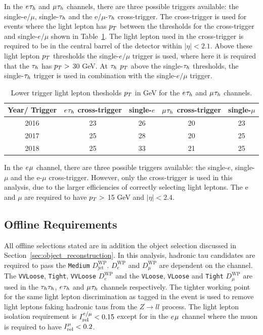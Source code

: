 In the $e_{}\tau_{h}$ and $\mu_{}\tau_{h}$ channels, there are three possible triggers available: the single-e/$\mu$, single-$\tau_{h}$ and the e/$\mu$-$\tau_{h}$ cross-trigger.
The cross-trigger is used for events where the light lepton has $p_{T}$ between the thresholds for the cross-trigger and single-$e/\mu$ shown in Table~\ref{tab:trig_thresholds}.
The light lepton used in the cross-trigger is required to be in the central barrel of the detector within $|\eta| < 2.1$.
Above these light lepton $p_{T}$ thresholds the single-$e/\mu$ trigger is used, where here it is required that the $\tau_{h}$ has $p_{T} >$ 30 GeV.
At $\tau_{h}$ $p_{T}$ above the single-$\tau_{h}$ thresholds, the single-$\tau_{h}$ trigger is used in combination with the single-$e/\mu$ trigger. \\

\begin{table}[hbtp]
  \centering
  \begin{tabular}{|c||c|c|c|c|}
    \hline
    Year/ Trigger   & $e_{}\tau_{h}$ cross-trigger & single-$e$ & $\mu_{}\tau_{h}$ cross-trigger & single-$\mu$ \\
    \hline
    \hline
    2016 & 23                    & 26         & 20                     & 23           \\
    2017 & 25                    & 28         & 20                     & 25           \\
    2018 & 25                    & 33         & 21                     & 25           \\
    \hline        
  \end{tabular}
  \caption{Lower trigger light lepton thesholds $p_{T}$ in GeV for the $e_{}\tau_{h}$ and $\mu_{}\tau_{h}$ channels.}
  \label{tab:trig_thresholds}  
\end{table}

In the $e_{}\mu_{}$ channel, there are three possible triggers available: the single-$e$, single-$\mu$ and the e-$\mu$ cross-trigger.
However, only the cross-trigger is used in this analysis, due to the larger efficiencies of correctly selecting light leptons.
The e and $\mu$ are required to have $p_{T} >$ 15 GeV and $|\eta| < 2.4$.

\subsection{Offline Requirements}

All offline selections stated are in addition the object selection discussed in Section~\ref{sec:object_reconstruction}.
In this analysis, hadronic tau candidates are required to pass the \texttt{Medium} $D_{\text{jet}}^{\text{WP}}$.
$D_{e}^{\text{WP}}$ and $D_{\mu}^{\text{WP}}$ are dependent on the channel.
The \texttt{VVLoose}, \texttt{Tight}, \texttt{VVLoose} $D_{e}^{\text{WP}}$ and the \texttt{VLoose}, \texttt{VLoose} and \texttt{Tight} $D_{\mu}^{\text{WP}}$ are used in the $\tau_{h}\tau_{h}$, $e_{}\tau_{h}$ and $\mu_{}\tau_{h}$ channels respectively.
The tighter working point for the same light lepton discrimination as tagged in the event is used to remove light leptons faking hadronic taus from the $Z \rightarrow ll$ process.
The light lepton isolation requirement is $I_{\text{rel}}^{e/\mu} < 0.15$ except for in the $e_{}\mu_{}$ channel where the muon is required to have $I_{\text{rel}}^{\mu} < 0.2$. \\

